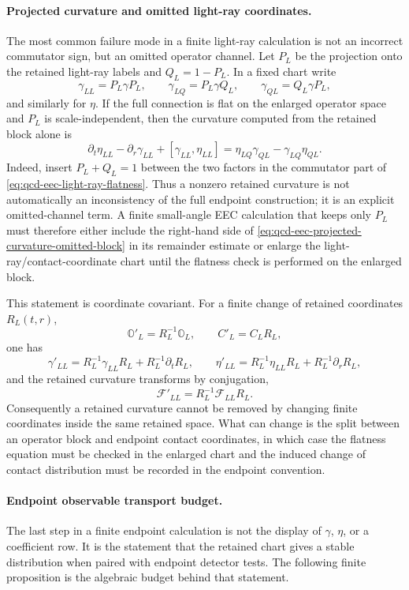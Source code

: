 \paragraph{Projected curvature and omitted light-ray coordinates.}
The most common failure mode in a finite light-ray calculation is not an
incorrect commutator sign, but an omitted operator channel.  Let \(P_L\) be the
projection onto the retained light-ray labels and \(Q_L=1-P_L\).  In a fixed
chart write
\[
  \gamma_{LL}=P_L\gamma P_L,\qquad
  \gamma_{LQ}=P_L\gamma Q_L,\qquad
  \gamma_{QL}=Q_L\gamma P_L,
\]
and similarly for \(\eta\).  If the full connection is flat on the enlarged
operator space and \(P_L\) is scale-independent, then the curvature computed
from the retained block alone is
\begin{equation}
  \partial_t\eta_{LL}-\partial_r\gamma_{LL}
  +[\gamma_{LL},\eta_{LL}]
  =
  \eta_{LQ}\gamma_{QL}-\gamma_{LQ}\eta_{QL}.
  \label{eq:qcd-eec-projected-curvature-omitted-block}
\end{equation}
Indeed, insert \(P_L+Q_L=1\) between the two factors in the commutator part of
\eqref{eq:qcd-eec-light-ray-flatness}.  Thus a nonzero retained curvature is
not automatically an inconsistency of the full endpoint construction; it is an
explicit omitted-channel term.  A finite small-angle EEC calculation that keeps
only \(P_L\) must therefore either include the right-hand side of
\eqref{eq:qcd-eec-projected-curvature-omitted-block} in its remainder estimate
or enlarge the light-ray/contact-coordinate chart until the flatness check is
performed on the enlarged block.

This statement is coordinate covariant.  For a finite change of retained
coordinates \(R_L(t,r)\),
\[
  \mathbb O'_L=R_L^{-1}\mathbb O_L,\qquad C'_L=C_LR_L,
\]
one has
\[
  \gamma'_{LL}=R_L^{-1}\gamma_{LL}R_L+R_L^{-1}\partial_tR_L,
  \qquad
  \eta'_{LL}=R_L^{-1}\eta_{LL}R_L+R_L^{-1}\partial_rR_L,
\]
and the retained curvature transforms by conjugation,
\[
  \mathcal F'_{LL}=R_L^{-1}\mathcal F_{LL}R_L .
\]
Consequently a retained curvature cannot be removed by changing finite
coordinates inside the same retained space.  What can change is the split
between an operator block and endpoint contact coordinates, in which case the
flatness equation must be checked in the enlarged chart and the induced change
of contact distribution must be recorded in the endpoint convention.

\paragraph{Endpoint observable transport budget.}
The last step in a finite endpoint calculation is not the display of
\(\gamma\), \(\eta\), or a coefficient row.  It is the statement that the
retained chart gives a stable distribution when paired with endpoint detector
tests.  The following finite proposition is the algebraic budget behind that
statement.


